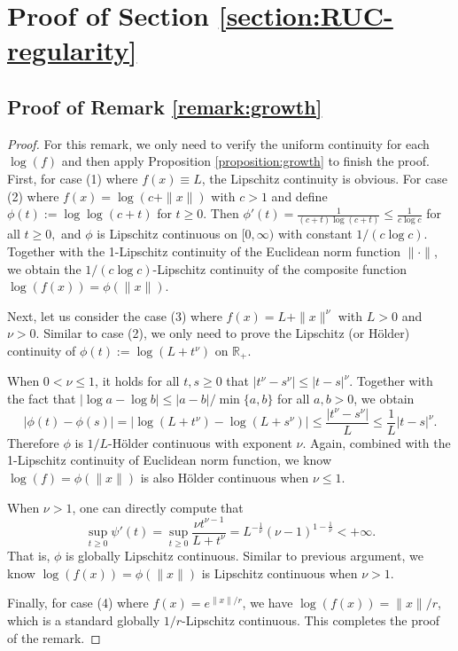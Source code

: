 \documentclass{article}
\begin{document}
\newpage
\appendix
{}

\section{Proof of Section \ref{section:RUC-regularity}}
\label{appdx:proposition:growth}


\subsection{Proof of Remark \ref{remark:growth}}
\label{appdx:remark:growth}
\begin{proof}
For this remark, we only need to verify the uniform continuity for each $\log(f)$ and then apply Proposition \ref{proposition:growth} to finish the proof.  First, for case (1) where $f(x)\equiv L$, the Lipschitz continuity is obvious. For case (2) where 
$f(x)=\log(c+\|x\|)$ with $c>1$ and define
$\phi(t):=\log\log(c+t)$ for $t\ge 0$. Then $
\phi'(t)=\frac{1}{(c+t)\log(c+t)}\le \frac{1}{c\log c}$ for all $t\ge 0,$
and $\phi$ is Lipschitz continuous on $[0,\infty)$ with constant $1/(c\log c)$. Together with the 1-Lipschitz continuity of the Euclidean norm function $\|\cdot\|$, we obtain the $1/(c\log c)$-Lipschitz continuity of the composite function 
$\log(f(x)) = \phi(\|x\|)$.

Next, let us consider the case (3) where $f(x)=L+\|x\|^\nu$ with $L>0$ and $\nu>0$. Similar to case (2), we only need to prove the Lipschitz (or H\"older) continuity of  
$\phi(t):=\log(L+t^\nu)$ on $\mathbb{R}_{+}$.

When $0<\nu\le 1$, it holds for all $t,s\ge 0$ that $|t^\nu-s^\nu|\le |t-s|^\nu$. Together with the fact that $|\log a-\log b|\le |a-b|/\min\{a,b\}$ for all $a,b>0$, we obtain
\[
|\phi(t)-\phi(s)|
=\big|\log(L+t^\nu)-\log(L+s^\nu)\big|
\le \frac{|t^\nu-s^\nu|}{L}
\le \frac{1}{L}|t-s|^\nu.
\]
Therefore $\phi$ is $1/L$-H\"older continuous with exponent $\nu$. Again, combined with the 1-Lipschitz continuity of Euclidean norm function, we know $\log(f) = \phi(\|x\|)$ is also H\"older continuous when $\nu\leq1$.

When $\nu>1$, one can directly compute that 
\[
\sup_{t\geq0}\psi'(t)=\sup_{t\geq0}\frac{\nu t^{\nu-1}}{L+t^\nu} = L^{-\frac{1}{\nu}}(\nu-1)^{1-\frac{1}{\nu}} < +\infty.
\]
That is, $\phi$ is globally Lipschitz continuous. Similar to previous argument, we know $\log(f(x)) = \phi(\|x\|)$ is Lipschitz continuous when $\nu>1$. 

Finally, for case (4) where $f(x)=e^{\|x\|/r}$, we have  $\log(f(x))=\|x\|/r$, which is a standard globally $1/r$-Lipschitz continuous. This completes the proof of the remark.
\end{proof}
\end{document}

